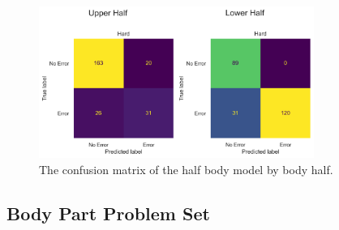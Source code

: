 \begin{figure}[ht]
  \centering
  \includegraphics[width=0.8\textwidth]{figures/Results/v1_bs_60_is_64_e_100/confusion/half_halves.png}
  \caption[half Body Confusion Matrix by Body Half]{The confusion matrix of the half body model by body half.}
  \label{fig:conf_v1_fb}
\end{figure}

\subsection{Body Part Problem Set}

